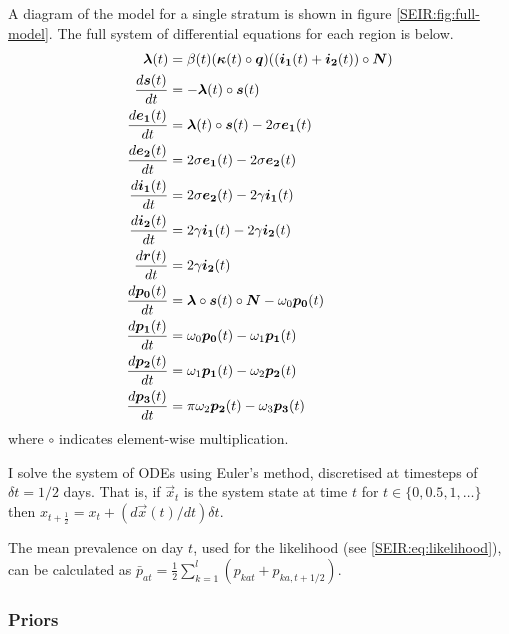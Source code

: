 \documentclass[thesis.tex]{subfiles}
\begin{document}
A diagram of the model for a single stratum is shown in figure \cref{SEIR:fig:full-model}.
The full system of differential equations for each region is below.
\begin{align}
    \label{SEIR:eq:fullODEs}
    \bm{\lambda}(t) &= \beta(t) (\bm{\kappa}(t) \circ \bm{q}) ((\bm{i_1}(t) + \bm{i_2}(t)) \circ \bm{N}) \\
    \frac{d\bm{s}(t)}{dt} &= -\bm{\lambda}(t) \circ \bm{s}(t) \\
    \frac{d\bm{e_1}(t)}{dt} &= \bm{\lambda}(t) \circ \bm{s}(t) - 2\sigma \bm{e_1}(t) \\
    \frac{d\bm{e_2}(t)}{dt} &= 2\sigma \bm{e_1}(t) - 2\sigma \bm{e_2}(t) \\
    \frac{d\bm{i_1}(t)}{dt} &= 2\sigma \bm{e_2}(t) - 2\gamma \bm{i_1}(t) \\
    \frac{d\bm{i_2}(t)}{dt} &= 2\gamma \bm{i_1}(t) - 2\gamma \bm{i_2}(t) \\
    \frac{d\bm{r}(t)}{dt} &= 2\gamma \bm{i_2}(t) \\
    \frac{d\bm{p_0}(t)}{dt} &= \bm{\lambda} \circ \bm{s}(t) \circ \bm{N} - \omega_0 \bm{p_0}(t) \\
    \frac{d\bm{p_1}(t)}{dt} &= \omega_0 \bm{p_0}(t) - \omega_1 \bm{p_1}(t) \\
    \frac{d\bm{p_2}(t)}{dt} &= \omega_1 \bm{p_1}(t) - \omega_{2} \bm{p_2}(t) \\
    \frac{d\bm{p_3}(t)}{dt} &= \pi \omega_{2} \bm{p_2}(t) - \omega_{3} \bm{p_3}(t)
\end{align}
where $\circ$ indicates element-wise multiplication.

I solve the system of ODEs using Euler's method, discretised at timesteps of $\delta t = 1/2$ days.
That is, if $\vec{x}_t$ is the system state at time $t$ for $t \in \{ 0, 0.5, 1, \dots \}$ then $x_{t+\frac{1}{2}} = x_t + (d\vec{x}(t)/dt) \delta t$.

The mean prevalence on day $t$, used for the likelihood (see \cref{SEIR:eq:likelihood}), can be calculated as $\bar{p}_{at} = \frac{1}{2} \sum_{k=1}^l ( p_{kat} + p_{ka,t+1/2} )$.

\subsubsection{Priors} \label{SEIR:sec:priors}
\end{document}

